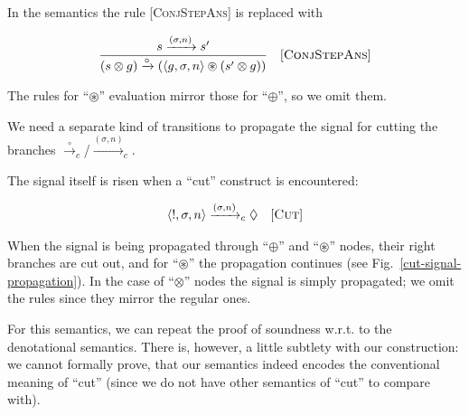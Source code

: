 In the semantics the rule \textsc{[ConjStepAns]} is replaced with

\[
\begin{array}{cr}
  \dfrac{s \xrightarrow{(\sigma, n)} s'}{(s \otimes g) \xrightarrow{\circ} (\left<{g, \sigma, n}\right> \circledast (s' \otimes g))} & \mbox{[\textsc{ConjStepAns}]} 
\end{array}
\]

The rules for ``$\circledast$'' evaluation mirror those for ``$\oplus$'', so we omit them.

We need a separate kind of transitions to propagate the signal for cutting the branches $\xrightarrow{\circ}_c$/$\xrightarrow{(\sigma, n)}_c$.

The signal itself is risen when a ``cut'' construct is encountered:

\[
\begin{array}{cr}
  \left<{!, \sigma, n}\right> \xrightarrow{(\sigma, n)}_c \Diamond &\mbox{[\textsc{Cut}]} 
\end{array}
\]

When the signal is being propagated through ``$\oplus$'' and ``$\circledast$'' nodes, their right branches are cut out, and for ``$\circledast$'' the
propagation continues (see Fig.~\ref{cut-signal-propagation}). In the case of ``$\otimes$'' nodes the signal is simply propagated; we omit the rules since they mirror the regular ones.

For this semantics, we can repeat the proof of soundness w.r.t. to the denotational semantics. There is, however, a little subtlety with our construction:
we cannot formally prove, that our semantics indeed encodes the conventional meaning of ``cut'' (since we do not have other semantics of ``cut'' to compare with).

